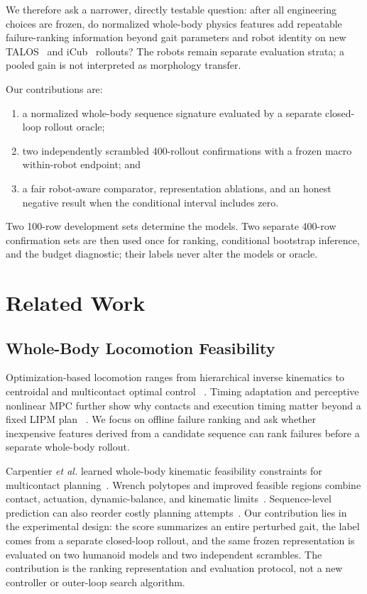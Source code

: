 \documentclass[letterpaper,10pt,conference]{IEEEtran}
\begin{document}
We therefore ask a narrower, directly testable question: after all engineering
choices are frozen, do normalized whole-body physics features add repeatable
failure-ranking information beyond gait parameters and robot identity on new
TALOS~\cite{stasse2017talos} and iCub~\cite{metta2010icub} rollouts? The robots
remain separate evaluation strata; a pooled gain is not interpreted as
morphology transfer.

Our contributions are:
\begin{enumerate}
  \item a normalized whole-body sequence signature evaluated by a separate
  closed-loop rollout oracle;
  \item two independently scrambled 400-rollout confirmations with a frozen
  macro within-robot endpoint; and
  \item a fair robot-aware comparator, representation ablations, and an honest
  negative result when the conditional interval includes zero.
\end{enumerate}

Two 100-row development sets determine the models. Two separate 400-row
confirmation sets are then used once for ranking, conditional bootstrap
inference, and the budget diagnostic; their labels never alter the models or
oracle.

\section{Related Work}
\subsection{Whole-Body Locomotion Feasibility}
Optimization-based locomotion ranges from hierarchical inverse kinematics to
centroidal and multicontact optimal control
~\cite{escande2014hqp,kuindersma2016atlas,winkler2018gait,mastalli2020crocoddyl,ponton2021multicontact}.
Timing adaptation and perceptive nonlinear MPC further show why contacts and
execution timing matter beyond a fixed LIPM plan
~\cite{khadiv2020timing,grandia2023perceptive}. We focus on offline failure
ranking and ask whether inexpensive features derived from a candidate sequence
can rank failures before a separate whole-body rollout.

Carpentier \emph{et al.} learned whole-body kinematic feasibility constraints
for multicontact planning~\cite{carpentier2017feasibility}. Wrench polytopes and
improved feasible regions combine contact, actuation, dynamic-balance, and
kinematic limits~\cite{orsolino2018wrench,abdalla2023feasibility}. Sequence-level
prediction can also reorder costly planning attempts~\cite{yang2023sequence}.
Our contribution lies in the experimental design: the score summarizes an
entire perturbed gait, the label comes from a separate closed-loop rollout, and
the same frozen representation is evaluated on two humanoid models and two
independent scrambles. The contribution is the ranking representation and
evaluation protocol, not a new controller or outer-loop search algorithm.
\end{document}
